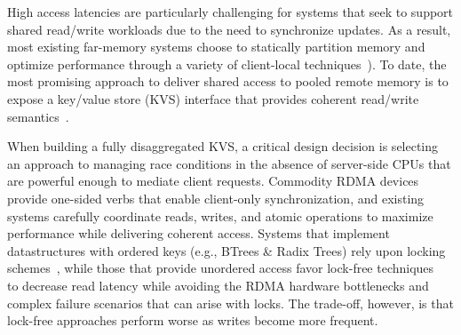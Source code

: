 High access latencies are particularly challenging for systems that
seek to support shared read/write workloads due to the need to
synchronize updates.
As a result, most existing far-memory systems choose to statically
partition memory and optimize performance through a
variety of client-local techniques~\cite{kona,mira,aifm,trackfm,carbink}).
To date, the most promising approach to deliver shared access to
pooled remote memory is to expose a key/value store (KVS) interface that
provides coherent read/write
semantics~\cite{rolex,smart,ditto,fusee,clover,sherman,ford}.

When building a fully disaggregated KVS, a critical design
decision is selecting an approach to managing race conditions in the
absence of server-side CPUs that are powerful enough to mediate client
requests.
Commodity RDMA devices provide one-sided verbs that enable client-only
synchronization, and existing systems carefully coordinate reads,
writes, and atomic operations to maximize performance while delivering
coherent access.  Systems that implement datastructures with ordered
keys (e.g., BTrees \& Radix Trees) rely upon locking
schemes~\cite{smart,sherman}, while those that provide unordered
access favor lock-free techniques~\cite{rolex,ditto,fusee,clover} to
decrease read latency while avoiding the RDMA hardware bottlenecks and complex
failure scenarios that can arise with locks.  The trade-off, however,
is that lock-free approaches perform worse as writes become more
frequent.

